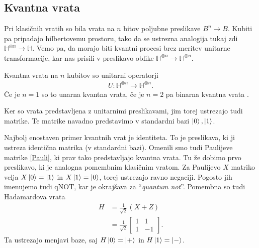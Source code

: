 \documentclass[mat1]{fmfdelo}
\newcommand{\Hb}{\mathbb H}
\begin{document}
\subsection{Kvantna vrata} Pri klasičnih vratih so bila vrata na \(n\) bitov poljubne preslikave \(B^n\to B\). Kubiti pa pripadajo hilbertovemu prostoru, tako da se ustrezna analogija tukaj zdi \(\Hb^{\otimes n}\to \Hb\). Vemo pa, da morajo biti kvantni procesi brez meritev unitarne transformacije, kar nas prisili v preslikavo oblike \(\Hb^{\otimes n}\to \Hb^{\otimes n}\).
\begin{definicija}
    Kvantna vrata na \(n\) kubitov so unitarni operatorji
    \begin{align*}
        U:\Hb^{\otimes n}\to \Hb^{\otimes n}.
    \end{align*}
    Če je \(n=1\) so to unarna kvantna vrata, če je \(n=2\) pa binarna kvantna vrata \cite[Definicija 5.7]{mathforqm}.
\end{definicija}
Ker so vrata predstavljena z unitarnimi preslikavami, jim torej ustrezajo tudi matrike. Te matrike navadno predstavimo v standardni bazi \(\ket0, \ket1\).

Najbolj enostaven primer kvantnih vrat je identiteta. To je preslikava, ki ji ustreza identična matrika (v standardni bazi). Omenili smo tudi Paulijeve matrike \ref{Pauli}, ki prav tako predstavljajo kvantna vrata. Tu že dobimo prvo preslikavo, ki je analogna pomembnim klasičnim vratom. Za Paulijevo \(X\) matriko velja \(X\ket0=\ket1\) in \(X\ket1=\ket0\), torej ustrezajo ravno negaciji. Pogosto jih imenujemo tudi \textsf{qNOT}, kar je okrajšava za ``\emph{quantum not}''. Pomembna so tudi Hadamardova vrata
\begin{align*}
    H &= \frac{1}{\sqrt{2}}(X+Z)\\
      &= \frac{1}{\sqrt2} \begin{bmatrix}
        1&1\\1&-1
    \end{bmatrix}.
\end{align*}
Ta ustrezajo menjavi baze, saj \(H\ket0=\ket+\) in \(H\ket1=\ket-\). 
\end{document}

